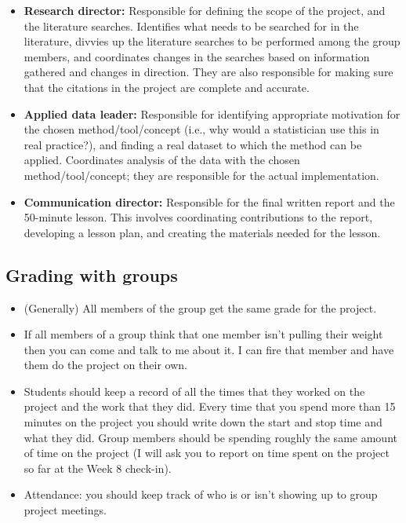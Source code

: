 \documentclass[11pt]{article}
\begin{document}
\begin{itemize}
\item \textbf{Research director:} Responsible for defining the scope of the project, and the literature searches. Identifies what needs to be searched for in the literature, divvies up the literature searches to be performed among the group members, and coordinates changes in the searches based on information gathered and changes in direction. They are also responsible for making sure that the citations in the project are complete and accurate.

\item \textbf{Applied data leader:} Responsible for identifying appropriate motivation for the chosen method/tool/concept (i.e., why would a statistician use this in real practice?), and finding a real dataset to which the method can be applied. Coordinates analysis of the data with the chosen method/tool/concept; they are responsible for the actual implementation.

\item \textbf{Communication director:} Responsible for the final written report and the 50-minute lesson. This involves coordinating contributions to the report, developing a lesson plan, and creating the materials needed for the lesson.
\end{itemize}

\subsection*{Grading with groups}

\begin{itemize}
\item (Generally) All members of the group get the same grade for the project.

\item If all members of a group think that one member isn’t pulling their weight then you can come and talk to me about it. I can fire that member and have them do the project on their own.

\item Students should keep a record of all the times that they worked on the project and the work that they did. Every time that you spend more than 15 minutes on the project you should write down the start and stop time and what they did. Group members should be spending roughly the same amount of time on the project (I will ask you to report on time spent on the project so far at the Week 8 check-in).

\item Attendance: you should keep track of who is or isn’t showing up to group project meetings.
\end{itemize}
\end{document}
